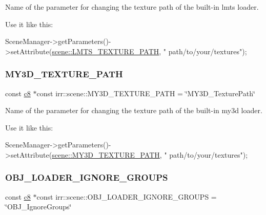 Name of the parameter for changing the texture path of the built-\/in lmts loader. 

Use it like this\+: 
\begin{DoxyCode}
SceneManager->getParameters()->setAttribute(\hyperlink{namespaceirr_1_1scene_a706d82611b9c61c9e2a7950dfef3bb1a}{scene::LMTS\_TEXTURE\_PATH}, \textcolor{stringliteral}{"
      path/to/your/textures"});
\end{DoxyCode}
 \mbox{\label{namespaceirr_1_1scene_ad5aaf45c7642044ccb4bb6855446c441}} 
\subsubsection{\texorpdfstring{M\+Y3\+D\+\_\+\+T\+E\+X\+T\+U\+R\+E\+\_\+\+P\+A\+TH}{MY3D\_TEXTURE\_PATH}}
{\footnotesize\ttfamily const \hyperlink{namespaceirr_a9395eaea339bcb546b319e9c96bf7410}{c8} $\ast$const irr\+::scene\+::\+M\+Y3\+D\+\_\+\+T\+E\+X\+T\+U\+R\+E\+\_\+\+P\+A\+TH = \char`\"{}M\+Y3\+D\+\_\+\+Texture\+Path\char`\"{}}



Name of the parameter for changing the texture path of the built-\/in my3d loader. 

Use it like this\+: 
\begin{DoxyCode}
SceneManager->getParameters()->setAttribute(\hyperlink{namespaceirr_1_1scene_ad5aaf45c7642044ccb4bb6855446c441}{scene::MY3D\_TEXTURE\_PATH}, \textcolor{stringliteral}{"
      path/to/your/textures"});
\end{DoxyCode}
 \mbox{\label{namespaceirr_1_1scene_acdf95538086272945defdef3b8f5b6d6}} 
\subsubsection{\texorpdfstring{O\+B\+J\+\_\+\+L\+O\+A\+D\+E\+R\+\_\+\+I\+G\+N\+O\+R\+E\+\_\+\+G\+R\+O\+U\+PS}{OBJ\_LOADER\_IGNORE\_GROUPS}}
{\footnotesize\ttfamily const \hyperlink{namespaceirr_a9395eaea339bcb546b319e9c96bf7410}{c8} $\ast$const irr\+::scene\+::\+O\+B\+J\+\_\+\+L\+O\+A\+D\+E\+R\+\_\+\+I\+G\+N\+O\+R\+E\+\_\+\+G\+R\+O\+U\+PS = \char`\"{}O\+B\+J\+\_\+\+Ignore\+Groups\char`\"{}}



